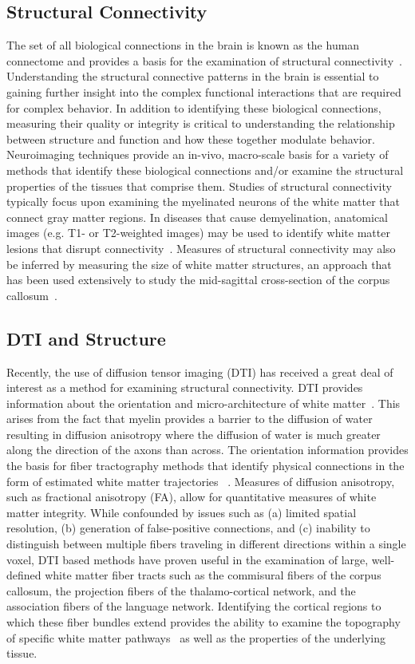 \subsection{Structural Connectivity}
The set of all biological connections in the brain is known as the human connectome and provides a basis for the examination of structural connectivity~\cite{Sporns2005}. Understanding the structural connective patterns in the brain is essential to gaining further insight into the complex functional interactions that are required for complex behavior. In addition to identifying these biological connections, measuring their quality or integrity is critical to understanding the relationship between structure and function and how these together modulate behavior.  Neuroimaging techniques provide an in-vivo, macro-scale basis for a variety of methods that identify these biological connections and/or examine the structural properties of the tissues that comprise them. Studies of structural connectivity typically focus upon examining the myelinated neurons of the white matter that connect gray matter regions. In diseases that cause demyelination, anatomical images (e.g. T1- or T2-weighted images) may be used to identify white matter lesions that disrupt connectivity~\cite{Loevblad2010}. Measures of structural connectivity may also be inferred by measuring the size of white matter structures, an approach that has been used extensively to study the mid-sagittal cross-section of the corpus callosum~\cite{Witelson1989,Colcombe2005a,Gunning-Dixon2000}. 

\subsection{DTI and Structure}
Recently, the use of diffusion tensor imaging (DTI) has received a great deal of interest as a method for examining structural connectivity. DTI provides information about the orientation and micro-architecture of white matter~\cite{Basser1996}. This arises from the fact that myelin provides a barrier to the diffusion of water resulting in diffusion anisotropy where the diffusion of water is much greater along the direction of the axons than across. The orientation information provides the basis for fiber tractography methods that identify physical connections in the form of estimated white matter trajectories ~\cite{Basser2000,Mori1999a}. Measures of diffusion anisotropy, such as fractional anisotropy (FA), allow for quantitative measures of white matter integrity.  While confounded by issues such as (a) limited spatial resolution, (b) generation of false-positive connections, and (c) inability to distinguish between multiple fibers traveling in different directions within a single voxel, DTI based methods have proven useful in the examination of large, well-defined white matter fiber tracts such as the commisural fibers of the corpus callosum, the projection fibers of the thalamo-cortical network, and the association fibers of the language network. Identifying the cortical regions to which these fiber bundles extend provides the ability to examine the topography of specific white matter pathways~\cite{Behrens2003} as well as the properties of the underlying tissue. 

